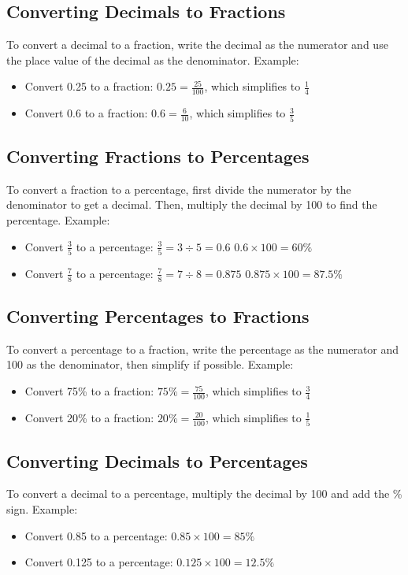 \subsection{Converting Decimals to Fractions}
To convert a decimal to a fraction, write the decimal as the numerator and use the place value of the decimal as the denominator. Example:
\begin{itemize}
    \item Convert 0.25 to a fraction: $0.25 = \frac{25}{100}$, which simplifies to $\frac{1}{4}$
    \item Convert 0.6 to a fraction: $0.6 = \frac{6}{10}$, which simplifies to $\frac{3}{5}$
\end{itemize}

\subsection{Converting Fractions to Percentages}
To convert a fraction to a percentage, first divide the numerator by the denominator to get a decimal. Then, multiply the decimal by 100 to find the percentage. Example:
\begin{itemize}
    \item Convert $\frac{3}{5}$ to a percentage: $\frac{3}{5} = 3 \div 5 = 0.6$ $0.6 \times 100 = 60\%$
    \item Convert $\frac{7}{8}$ to a percentage: $\frac{7}{8} = 7 \div 8 = 0.875$ $0.875 \times 100 = 87.5\%$
\end{itemize}

\subsection{Converting Percentages to Fractions}
To convert a percentage to a fraction, write the percentage as the numerator and 100 as the denominator, then simplify if possible. Example:
\begin{itemize}
    \item Convert 75\% to a fraction: $75\% = \frac{75}{100}$, which simplifies to $\frac{3}{4}$
    \item Convert 20\% to a fraction: $20\% = \frac{20}{100}$, which simplifies to $\frac{1}{5}$
\end{itemize}

\subsection{Converting Decimals to Percentages}
To convert a decimal to a percentage, multiply the decimal by 100 and add the \% sign. Example:
\begin{itemize}
    \item Convert 0.85 to a percentage: $0.85 \times 100 = 85\%$
    \item Convert 0.125 to a percentage: $0.125 \times 100 = 12.5\%$
\end{itemize}

